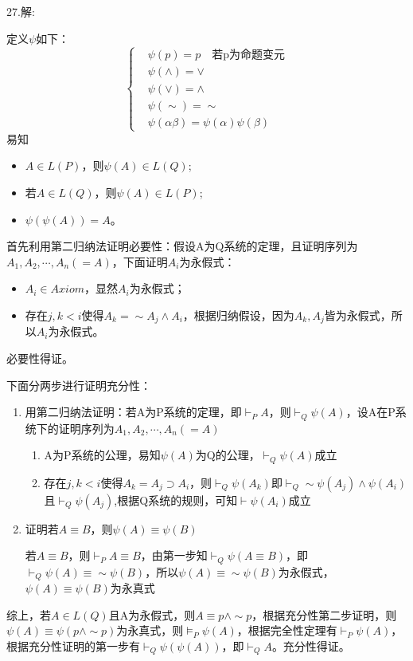 \documentclass[a4paper]{ctexart}
\begin{document}
\noindent 27.解:

定义$\psi$如下：$$
\left\{
  \begin{aligned}
    &\psi(p)=p\quad\text{若p为命题变元} \\
    &\psi(\wedge) = \vee \\ 
    &\psi(\vee)=\wedge \\
    &\psi(\sim) =\sim \\
    &\psi(\alpha\beta)=\psi(\alpha)\psi(\beta)
  \end{aligned}
\right.
$$
易知
\begin{itemize}
  \item $A\in L(P)$，则$\psi(A)\in L(Q)$;
  \item 若$A\in L(Q)$，则$\psi(A)\in L(P)$;
  \item $\psi(\psi(A))=A$。
\end{itemize}

首先利用第二归纳法证明必要性：假设A为Q系统的定理，且证明序列为$A_1,A_2,\cdots,A_n(=A)$，下面证明$A_i$为永假式：
\begin{itemize}
  \item $A_i\in Axiom$，显然$A_i$为永假式；
  \item 存在$j,k<i$使得$A_k=\sim A_j\wedge A_i$，根据归纳假设，因为$A_k,A_j$皆为永假式，所以$A_i$为永假式。
\end{itemize}
必要性得证。

\noindent 下面分两步进行证明充分性：
\begin{enumerate}
  \item 用第二归纳法证明：若A为P系统的定理，即$\vdash_P A$，则$\vdash_{Q}\psi(A)$，设A在P系统下的证明序列为$A_1,A_2,\cdots,A_n(=A)$
  \begin{enumerate}
    \item A为P系统的公理，易知$\psi(A)$为Q的公理，$\vdash_{Q}\psi(A)$成立
    \item 存在$j,k<i$使得$A_k=A_j\supset A_i$，则$\vdash_Q \psi(A_k)$即$\vdash_Q\sim \psi(A_j)\wedge\psi(A_i)$且$\vdash_Q \psi(A_j)$,根据Q系统的规则，可知$\vdash\psi(A_i)$成立
  \end{enumerate}
  \item 证明若$A\equiv B$，则$\psi(A)\equiv\psi(B)$
  
  若$A\equiv B$，则$\vdash_P A\equiv B$，由第一步知$\vdash_Q \psi(A\equiv B)$，即$\vdash_Q \psi(A)\equiv \sim \psi(B)$，所以$\psi(A)\equiv \sim \psi(B)$为永假式，$\psi(A)\equiv \psi(B)$为永真式
\end{enumerate}

综上，若$A\in L(Q)$且A为永假式，则$A\equiv p\wedge\sim p$，根据充分性第二步证明，则$\psi(A)\equiv \psi(p\wedge\sim p)$为永真式，则$\models_P\psi(A)$，根据完全性定理有$\vdash_P\psi(A)$，根据充分性证明的第一步有$\vdash_Q \psi(\psi(A))$，即$\vdash_QA$。充分性得证。\newline
\end{document}
